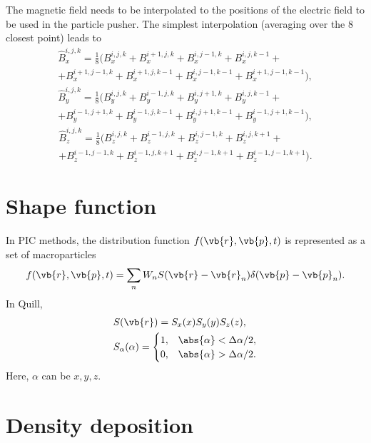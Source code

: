 \documentclass[12pt,a4paper,DIV=calc]{scrartcl}
\begin{document}
The magnetic field needs to be interpolated to the positions of the electric field to be used in the particle pusher.
The simplest interpolation (averaging over the 8 closest point) leads to
\begin{multline}
    \hat{B}_x^{i,j,k} = \frac{1}{8} \big(B_x^{i,j,k} + B_x^{i+1,j,k} + B_x^{i,j-1,k} + B_x^{i,j,k-1} + \\
    + B_x^{i+1,j-1,k} + B_x^{i+1,j,k-1} + B_x^{i,j-1,k-1} + B_x^{i+1,j-1,k-1} \big),
\end{multline}
\begin{multline}
    \hat{B}_y^{i,j,k} = \frac{1}{8} \big(B_y^{i,j,k} + B_y^{i-1,j,k} + B_y^{i,j+1,k} + B_y^{i,j,k-1} + \\
    + B_y^{i-1,j+1,k} + B_y^{i-1,j,k-1} + B_y^{i,j+1,k-1} + B_y^{i-1,j+1,k-1} \big),
\end{multline}
\begin{multline}
    \hat{B}_z^{i,j,k} = \frac{1}{8} \big(B_z^{i,j,k} + B_z^{i-1,j,k} + B_z^{i,j-1,k} + B_z^{i,j,k+1} + \\
    + B_z^{i-1,j-1,k} + B_z^{i-1,j,k+1} + B_z^{i,j-1,k+1} + B_z^{i-1,j-1,k+1}\big).
\end{multline}

\section{Shape function}
In PIC methods, the distribution function $f(\vb{r},\vb{p},t)$ is represented as a set of macroparticles
\begin{equation}
    f(\vb{r},\vb{p},t) = \sum_n W_n S(\vb{r} - \vb{r}_n) \delta(\vb{p} - \vb{p}_n).
\end{equation}
In Quill,
\begin{align}
    &S(\vb{r}) = S_x(x) S_y(y) S_z(z),\\
    &S_\alpha(\alpha) = \begin{cases}
        1,&\abs{\alpha} < \Delta \alpha/2,\\
        0,&\abs{\alpha} > \Delta \alpha/2.
    \end{cases}
\end{align}
Here, $\alpha$ can be $x,y,z$.

\section{Density deposition}
\end{document}
